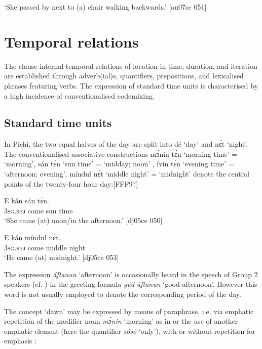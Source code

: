 \glt ‘She passed by next to (a) chair walking backwards.’ [au07se 051]
\z

\section{Temporal relations}\label{sec:8.2}

The clause-internal temporal relations of location in time, duration, and iteration are established through adverb(ial)s, quantifiers, prepositions, and lexicalised phrases featuring verbs. The expression of standard time units is characterised by a high incidence of conventionalised codemixing.

\subsection{Standard time units}

In Pichi, the two equal halves of the day are split into dé ‘day’ and nɛ́t ‘night’. The conventionalised associative constructions mɔ́nin tɛ́n ‘morning time’ = ‘morning’, sán tɛ́n ‘sun time’ = ‘midday; noon’ , ívin tɛ́n ‘evening time’ = ‘afternoon; evening’, míndul nɛ́t ‘middle night’ = ‘midnight’  denote the central points of the twenty-four hour day:[FFF9?]


\ea%
    \label{ex:key:995}
    \gll E    kán    sán  tɛ́n.\\
\textsc{3sg.sbj}  come  sun  time\\

\glt ‘She came (at) noon/in the afternoon.’ [dj05ce 050]
\z


\ea%
    \label{ex:key:996}
    \gll E    kán    míndul  nɛ́t.\\
\textsc{3sg.sbj}  come  middle  night\\

\glt ‘He came (at) midnight.’ [dj05ce 053]
\z

The expression \textit{áftanun} ‘afternoon’ is occasionally heard in the speech of Group 2 speakers (cf. ) in the greeting formula \textit{gúd áftanun} ‘good afternoon’. However this word is not usually employed to denote the corresponding period of the day.


The concept ‘dawn’ may be expressed by means of paraphrase, i.e. via emphatic repetition of the modifier noun \textit{mɔ́nin} ‘morning’ as in  or the use of another emphatic element (here the quantifier \textit{sósó} ‘only’), with or without repetition for emphasis :




